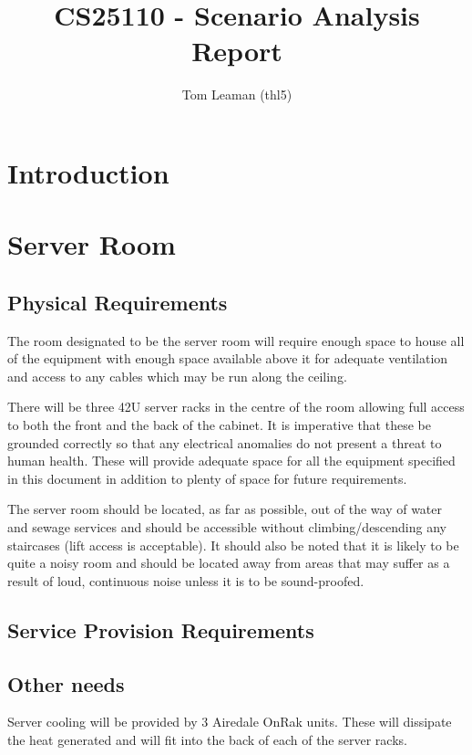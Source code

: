 \documentclass[a4paper, twoside]{article}
\title{CS25110 - Scenario Analysis Report}
\author{Tom Leaman (thl5)}
\begin{document}
\maketitle
\newpage
\tableofcontents
\newpage

\section{Introduction}

\section{Server Room}
\subsection{Physical Requirements}
The room designated to be the server room will require enough space to house all
of the equipment with enough space available above it for adequate ventilation
and access to any cables which may be run along the ceiling.

There will be three 42U server racks in the centre of the room allowing full access
to both the front and the back of the cabinet. It is imperative that these be
grounded correctly so that any electrical anomalies do not present a threat to
human health. These will provide adequate space for all the equipment specified
in this document in addition to plenty of space for future requirements.

The server room should be located, as far as possible, out of the way of water
and sewage services and should be accessible without climbing/descending any
staircases (lift access is acceptable). It should also be noted that it is
likely to be quite a noisy room and should be located away from areas that may
suffer as a result of loud, continuous noise unless it is to be sound-proofed.

\subsection{Service Provision Requirements}

\subsection{Other needs}
Server cooling will be provided by 3 Airedale OnRak units. These will dissipate
the heat generated and will fit into the back of each of the server racks.
\end{document}
